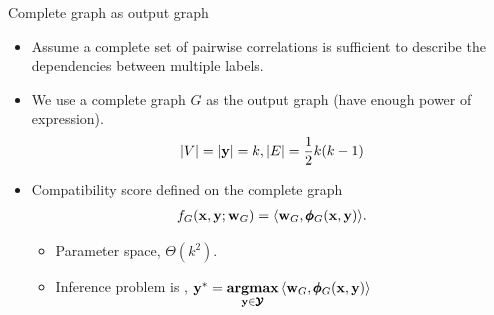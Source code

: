 \documentclass[first=dgreen,second=purple,logo=yellowexc]{aaltoslides}
\begin{document}
{\begin{frame}{Complete graph as output graph}
	\begin{itemize}
		\item Assume a complete set of pairwise correlations is sufficient to describe the dependencies between multiple labels.
		\item We use a complete graph $G$ as the output graph (have enough power of expression).
		\begin{align*}
			|V| = |\mathbf {y}| = k, |E| = \frac{1}{2}k(k-1)
		\end{align*}
		\item Compatibility score defined on the complete graph  
		\begin{align*}
			f_G(\mathbf {x},\mathbf {y};\mathbf {w}_G) = \langle \mathbf {w}_G, \pmb \phi_G(\mathbf {x},\mathbf {y}) \rangle.
		\end{align*}
		\begin{itemize}
			\footnotesize
			\item Parameter space, $\Theta(k^2)$.
			\item Inference problem is \nphard, $\mathbf {y}^* = \underset{\mathbf {y}\in\pmb {\mathcal{Y}}}{\textbf{argmax}}\, \langle \mathbf {w}_G, \pmb \phi_G(\mathbf {x},\mathbf {y}) \rangle$
		\end{itemize}
	\end{itemize}
\end{frame}

}
\end{document}
